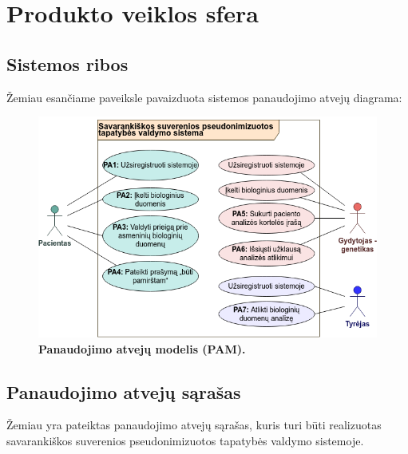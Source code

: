 \documentclass[12pt]{article}
\begin{document}
\newpage

\section{Produkto veiklos sfera} %
\subsection{Sistemos ribos}
Žemiau esančiame paveiksle pavaizduota sistemos panaudojimo atvejų diagrama:

\begin{figure}[ht]
    \begin{center}
        \captionsetup{justification=centering}
        \includegraphics[width=1.05\linewidth]{PAM.png}
        \vspace{-1\baselineskip}
        \caption{\small\textbf{Panaudojimo atvejų modelis (PAM).}}
        \label{fig:image2}
    \end{center}
\end{figure}

\subsection{Panaudojimo atvejų sąrašas}
Žemiau yra pateiktas panaudojimo atvejų sąrašas, kuris turi būti realizuotas
savarankiškos suverenios pseudonimizuotos tapatybės valdymo sistemoje.
\end{document}
